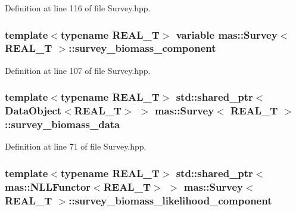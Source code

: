Definition at line 116 of file Survey.\-hpp.

\hypertarget{structmas_1_1_survey_ad2cbd5ec4cb7f54ee7312fd1dece26c4}{
\subsubsection[{survey\-\_\-biomass\-\_\-component}]{\setlength{\rightskip}{0pt plus 5cm}template$<$typename R\-E\-A\-L\-\_\-\-T$>$ {\bf variable} {\bf mas\-::\-Survey}$<$ R\-E\-A\-L\-\_\-\-T $>$\-::survey\-\_\-biomass\-\_\-component}}\label{structmas_1_1_survey_ad2cbd5ec4cb7f54ee7312fd1dece26c4}


Definition at line 107 of file Survey.\-hpp.

\hypertarget{structmas_1_1_survey_aed7561a0147e5abfa07acab7baa9292f}{
\subsubsection[{survey\-\_\-biomass\-\_\-data}]{\setlength{\rightskip}{0pt plus 5cm}template$<$typename R\-E\-A\-L\-\_\-\-T$>$ std\-::shared\-\_\-ptr$<${\bf Data\-Object}$<$R\-E\-A\-L\-\_\-\-T$>$ $>$ {\bf mas\-::\-Survey}$<$ R\-E\-A\-L\-\_\-\-T $>$\-::survey\-\_\-biomass\-\_\-data}}\label{structmas_1_1_survey_aed7561a0147e5abfa07acab7baa9292f}


Definition at line 71 of file Survey.\-hpp.

\hypertarget{structmas_1_1_survey_abee83156dc5c12a911adc3e107931d3d}{
\subsubsection[{survey\-\_\-biomass\-\_\-likelihood\-\_\-component}]{\setlength{\rightskip}{0pt plus 5cm}template$<$typename R\-E\-A\-L\-\_\-\-T$>$ std\-::shared\-\_\-ptr$<${\bf mas\-::\-N\-L\-L\-Functor}$<$R\-E\-A\-L\-\_\-\-T$>$ $>$ {\bf mas\-::\-Survey}$<$ R\-E\-A\-L\-\_\-\-T $>$\-::survey\-\_\-biomass\-\_\-likelihood\-\_\-component}}\label{structmas_1_1_survey_abee83156dc5c12a911adc3e107931d3d}


